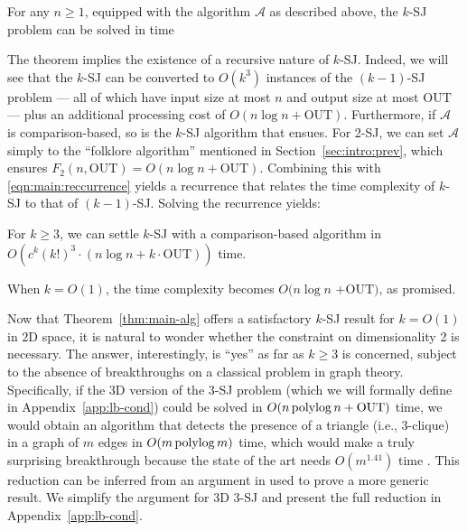 \documentclass[sigconf]{acmart}
\def\vgap{\vspace{1mm}}
\def\A{\mathcal{A}}
\def\out{\mathrm{OUT}}
\begin{document}
\begin{theorem} \label{thm:main-recur}
    For any $n \ge 1$, equipped with the algorithm $\A$ as described above, the $k$-SJ problem can be solved in time
    \myeqn{
        O(k^3) \cdot \big( F_{k-1}(n, \out) + n \log n + k \cdot \out \big).
        \nn
    }
\end{theorem}

The theorem implies the existence of a recursive nature of $k$-SJ. Indeed, we will see that the $k$-SJ can be converted to $O(k^3)$ instances of the $(k-1)$-SJ problem --- all of which have input size at most $n$ and output size at most $\out$ --- plus an additional processing cost of $O(n \log n + \out)$. Furthermore, if $\A$ is comparison-based, so is the $k$-SJ algorithm that ensues. For 2-SJ, we can set $\A$ simply to the ``folklore algorithm'' mentioned in Section~\ref{sec:intro:prev}, which ensures $F_2(n, \out) = O(n \log n + \out)$. Combining this with \eqref{eqn:main:reccurrence} yields a recurrence that relates the time complexity of $k$-SJ to that of $(k-1)$-SJ. Solving the recurrence yields:

\begin{theorem} \label{thm:main-alg}
    For $k \ge 3$, we can settle $k$-SJ with a comparison-based algorithm in $O( c^k (k!)^3 \cdot (n \log n + k \cdot \out))$ time.
\end{theorem}


When $k = O(1)$, the time complexity becomes $O(n \log n$ $+ \out)$, as promised.

\vgap 

Now that Theorem~\ref{thm:main-alg} offers a satisfactory $k$-SJ result for $k = O(1)$ in 2D space, it is natural to wonder whether the constraint on dimensionality 2 is necessary. The answer, interestingly, is ``yes'' as far as $k \ge 3$ is concerned, subject to the absence of breakthroughs on a classical problem in graph theory. Specifically, if the 3D version of the 3-SJ problem (which we will formally define in Appendix~\ref{app:lb-cond}) could be solved in $O(n \polylog n + \out)$ time, we would obtain an algorithm that detects the presence of a triangle (i.e., 3-clique) in a graph of $m$ edges in $O(m \operatorname*{polylog} m)$ time, which would make a truly surprising breakthrough because the state of the art needs $O(m^{1.41})$ time \cite{ayz97}. This reduction can be inferred from an argument in \cite{kcko22} used to prove a more generic result. We simplify the argument for 3D 3-SJ and present the full reduction in Appendix~\ref{app:lb-cond}.
\end{document}
